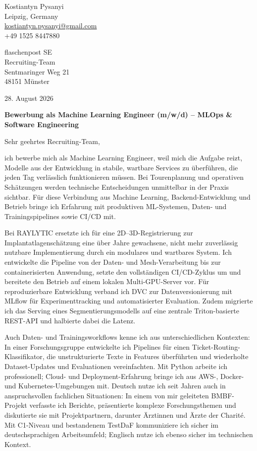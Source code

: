 \documentclass[11pt,a4paper]{article}
\begin{document}
\begin{flushright}
Kostiantyn Pysanyi\\
Leipzig, Germany\\
\href{mailto:kostiantyn.pysanyi@gmail.com}{kostiantyn.pysanyi@gmail.com}\\
+49 1525 8447880
\end{flushright}

flaschenpost SE\\
Recruiting-Team\\
Sentmaringer Weg 21\\
48151 Münster

\begin{flushright}
28. August 2026
\end{flushright}

\textbf{Bewerbung als Machine Learning Engineer (m/w/d) -- MLOps \& Software Engineering}

Sehr geehrtes Recruiting-Team,

ich bewerbe mich als Machine Learning Engineer, weil mich die Aufgabe reizt, Modelle aus der Entwicklung in stabile, wartbare Services zu überführen, die jeden Tag verlässlich funktionieren müssen. Bei Tourenplanung und operativen Schätzungen werden technische Entscheidungen unmittelbar in der Praxis sichtbar. Für diese Verbindung aus Machine Learning, Backend-Entwicklung und Betrieb bringe ich Erfahrung mit produktiven ML-Systemen, Daten- und Trainingspipelines sowie CI/CD mit.

Bei RAYLYTIC ersetzte ich für eine 2D--3D-Registrierung zur Implantatlagenschätzung eine über Jahre gewachsene, nicht mehr zuverlässig nutzbare Implementierung durch ein modulares und wartbares System. Ich entwickelte die Pipeline von der Daten- und Mesh-Verarbeitung bis zur containerisierten Anwendung, setzte den vollständigen CI/CD-Zyklus um und bereitete den Betrieb auf einem lokalen Multi-GPU-Server vor. Für reproduzierbare Entwicklung verband ich DVC zur Datenversionierung mit MLflow für Experimenttracking und automatisierter Evaluation. Zudem migrierte ich das Serving eines Segmentierungsmodells auf eine zentrale Triton-basierte REST-API und halbierte dabei die Latenz.

Auch Daten- und Trainingsworkflows kenne ich aus unterschiedlichen Kontexten: In einer Forschungsgruppe entwickelte ich Pipelines für einen Ticket-Routing-Klassifikator, die unstrukturierte Texte in Features überführten und wiederholte Dataset-Updates und Evaluationen vereinfachten. Mit Python arbeite ich professionell; Cloud- und Deployment-Erfahrung bringe ich aus AWS-, Docker- und Kubernetes-Umgebungen mit. Deutsch nutze ich seit Jahren auch in anspruchsvollen fachlichen Situationen: In einem von mir geleiteten BMBF-Projekt verfasste ich Berichte, präsentierte komplexe Forschungsthemen und diskutierte sie mit Projektpartnern, darunter Ärztinnen und Ärzte der Charité. Mit C1-Niveau und bestandenem TestDaF kommuniziere ich sicher im deutschsprachigen Arbeitsumfeld; Englisch nutze ich ebenso sicher im technischen Kontext.
\end{document}
